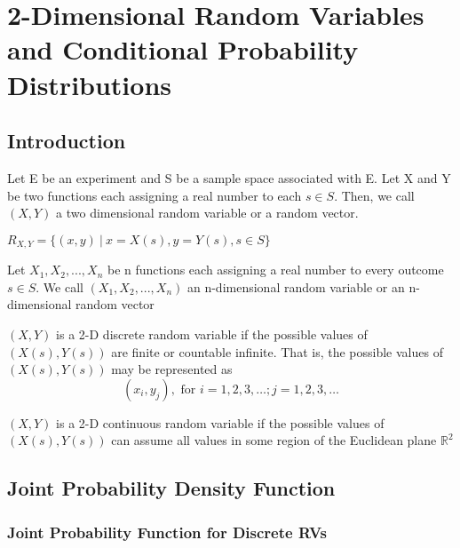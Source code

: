 \chapter{2-Dimensional Random Variables and Conditional Probability Distributions}

\section{Introduction}

\begin{definition}
Let E be an experiment and S be a sample space associated with E. Let X and Y be two functions each assigning a real number to each $s \in S$. Then, we call $(X,Y)$ a two dimensional random variable or a random vector.
\end{definition}



\begin{definition}
$R_{X,Y} = \{ (x,y)\  |\  x = X(s), y = Y(s), s \in S \}$
\end{definition}

\begin{definition}
Let $X_1, X_2, ... , X_n$ be n functions each assigning a real number to every outcome $s \in S$. We call $(X_1, X_2, ..., X_n)$ an n-dimensional random variable or an n-dimensional random vector
\end{definition}

\begin{definition}
$(X,Y)$ is a 2-D discrete random variable if the possible values of $(X(s), Y(s))$ are finite or countable infinite. That is, the possible values of $(X(s), Y(s))$ may be represented as 
$$
(x_i, y_j), \text{ for } i = 1,2,3, \dots ; j = 1,2,3, \dots 
$$
\end{definition}

\begin{definition}
$(X,Y)$ is a 2-D continuous random variable if the possible values of $(X(s), Y(s))$ can assume all values in some region of the Euclidean plane $\mathbb{R}^2$
\end{definition}

\section{Joint Probability Density Function}

\subsection{Joint Probability Function for Discrete RVs}

